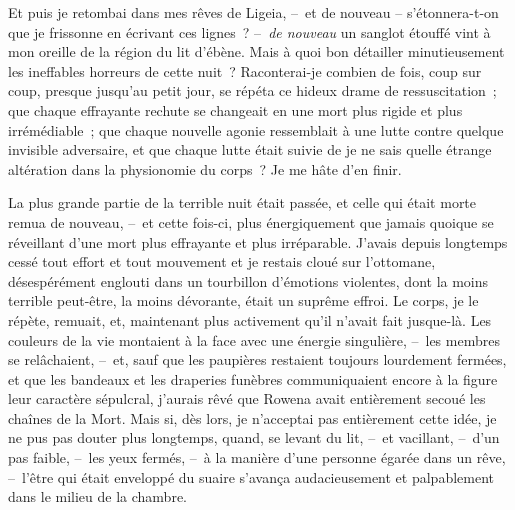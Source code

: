 \documentclass[french,twoside]{book} %
\begin{document}
Et puis je retombai dans mes rêves de Ligeia, – et de nouveau – s’étonnera-t-on que je frissonne en écrivant ces lignes ? – \emph{de nouveau} un sanglot étouffé vint à mon oreille de la région du lit d’ébène. Mais à quoi bon détailler minutieusement les ineffables horreurs de cette nuit ? Raconterai-je combien de fois, coup sur coup, presque jusqu’au petit jour, se répéta ce hideux drame de ressuscitation ; que chaque effrayante rechute se changeait en une mort plus rigide et plus irrémédiable ; que chaque nouvelle agonie ressemblait à une lutte contre quelque invisible adversaire, et que chaque lutte était suivie de je ne sais quelle étrange altération dans la physionomie du corps ? Je me hâte d’en finir.\par
La plus grande partie de la terrible nuit était passée, et celle qui était morte remua de nouveau, – et cette fois-ci, plus énergiquement que jamais quoique se réveillant d’une mort plus effrayante et plus irréparable. J’avais depuis longtemps cessé tout effort et tout mouvement et je restais cloué sur l’ottomane, désespérément englouti dans un tourbillon d’émotions violentes, dont la moins terrible peut-être, la moins dévorante, était un suprême effroi. Le corps, je le répète, remuait, et, maintenant plus activement qu’il n’avait fait jusque-là. Les couleurs de la vie montaient à la face avec une énergie singulière, – les membres se relâchaient, – et, sauf que les paupières restaient toujours lourdement fermées, et que les bandeaux et les draperies funèbres communiquaient encore à la figure leur caractère sépulcral, j’aurais rêvé que Rowena avait entièrement secoué les chaînes de la Mort. Mais si, dès lors, je n’acceptai pas entièrement cette idée, je ne pus pas douter plus longtemps, quand, se levant du lit, – et vacillant, – d’un pas faible, – les yeux fermés, – à la manière d’une personne égarée dans un rêve, – l’être qui était enveloppé du suaire s’avança audacieusement et palpablement dans le milieu de la chambre.\par
\end{document}
